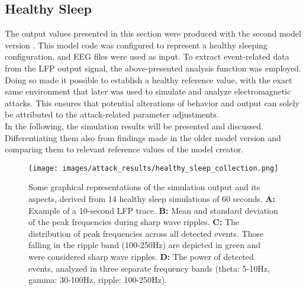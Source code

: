     
    \subsection{Healthy Sleep}
    The output values presented in this section were produced with the second model version \cite{HippSimModel.2}. This model code was configured to represent a healthy sleeping configuration, and EEG files were used as input. To extract event-related data from the LFP output signal, the above-presented analysis function was employed. Doing so made it possible to establish a healthy reference value, with the exact same environment that later was used to simulate and analyze electromagnetic attacks. This ensures that potential alterations of behavior and output can solely be attributed to the attack-related parameter adjustments.\\
    In the following, the simulation results will be presented and discussed. Differentiating them also from findings made in the older model version and comparing them to relevant reference values of the model creator.

    \begin{figure}[htbp]
        \centering
        \texttt{[image: images/attack\_results/healthy\_sleep\_collection.png]}
        \caption{Some graphical representations of the simulation output and its aspects, derived from 14 healthy sleep simulations of 60 seconds. \textbf{A:} Example of a 10-second LFP trace. \textbf{B:} Mean and standard deviation of the peak frequencies during sharp wave ripples. \textbf{C:} The distribution of peak frequencies across all detected events. Those falling in the ripple band (100-250Hz) are depicted in green and were considered sharp wave ripples. \textbf{D:} The power of detected events, analyzed in three separate frequency bands (theta: 5-10Hz, gamma: 30-100Hz, ripple: 100-250Hz).}
        \label{fig:healthy_collection}
    \end{figure}
        
